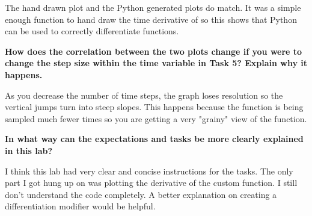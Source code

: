 \documentclass{article}
\begin{document}
The hand drawn plot and the Python generated plots do match. It was a simple enough function to hand draw the time derivative of so this shows that Python can be used to correctly differentiate functions.


\textbf{How does the correlation between the two plots change if you were to change the step size within the time variable in Task 5? Explain why it happens.}

As you decrease the number of time steps, the graph loses resolution so the vertical jumps turn into steep slopes. This happens because the function is being sampled much fewer times so you are getting a very "grainy" view of the function.


\textbf{In what way can the expectations and tasks be more clearly explained in this lab?}

I think this lab had very clear and concise instructions for the tasks. The only part I got hung up on was plotting the derivative of the custom function. I still don't understand the code completely. A better explanation on creating a differentiation modifier would be helpful.
\end{document}
